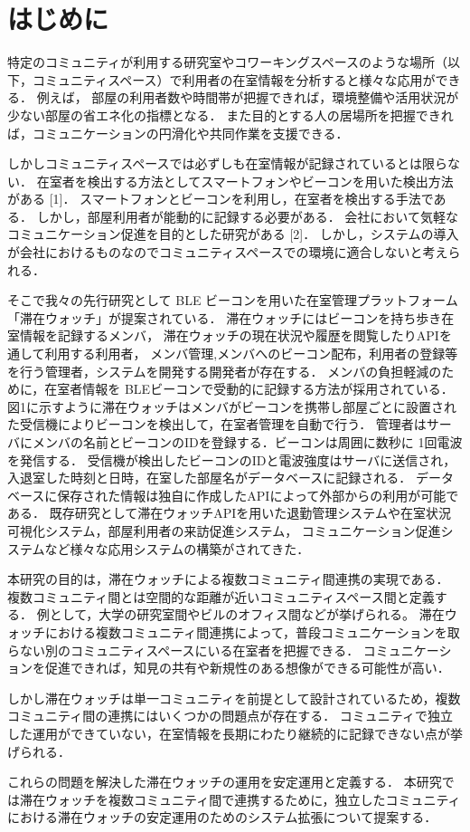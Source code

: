\pagestyle{empty}


\section{はじめに}
\label{sec:intro}
特定のコミュニティが利用する研究室やコワーキングスペースのような場所（以下，コミュニティスペース）で利用者の在室情報を分析すると様々な応用ができる．
例えば， 部屋の利用者数や時間帯が把握できれば，環境整備や活用状況が少ない部屋の省エネ化の指標となる．
また目的とする人の居場所を把握できれば，コミュニケーションの円滑化や共同作業を支援できる．

しかしコミュニティスペースでは必ずしも在室情報が記録されているとは限らない．
在室者を検出する方法としてスマートフォンやビーコンを用いた検出方法がある [1]．
スマートフォンとビーコンを利用し，在室者を検出する手法である．
しかし，部屋利用者が能動的に記録する必要がある．
会社において気軽なコミュニケーション促進を目的とした研究がある [2]．
しかし，システムの導入が会社におけるものなのでコミュニティスペースでの環境に適合しないと考えられる．

そこで我々の先行研究として BLE ビーコンを用いた在室管理プラットフォーム「滞在ウォッチ」が提案されている．
滞在ウォッチにはビーコンを持ち歩き在室情報を記録するメンバ，
滞在ウォッチの現在状況や履歴を閲覧したりAPIを通して利用する利用者，
メンバ管理,メンバへのビーコン配布，利用者の登録等を行う管理者，システムを開発する開発者が存在する．
メンバの負担軽減のために，在室者情報を BLEビーコンで受動的に記録する方法が採用されている．
図1に示すように滞在ウォッチはメンバがビーコンを携帯し部屋ごとに設置された受信機によりビーコンを検出して，在室者管理を自動で行う．
管理者はサーバにメンバの名前とビーコンのIDを登録する．ビーコンは周囲に数秒に 1回電波を発信する．
受信機が検出したビーコンのIDと電波強度はサーバに送信され，入退室した時刻と日時，在室した部屋名がデータベースに記録される．
データベースに保存された情報は独自に作成したAPIによって外部からの利用が可能である．
既存研究として滞在ウォッチAPIを用いた退勤管理システムや在室状況可視化システム，部屋利用者の来訪促進システム，
コミュニケーション促進システムなど様々な応用システムの構築がされてきた．

本研究の目的は，滞在ウォッチによる複数コミュニティ間連携の実現である．
複数コミュニティ間とは空間的な距離が近いコミュニティスペース間と定義する．
例として，大学の研究室間やビルのオフィス間などが挙げられる。
滞在ウォッチにおける複数コミュニティ間連携によって，普段コミュニケーションを取らない別のコミュニティスペースにいる在室者を把握できる．
コミュニケーションを促進できれば，知見の共有や新規性のある想像ができる可能性が高い．

しかし滞在ウォッチは単一コミュニティを前提として設計されているため，複数コミュニティ間の連携にはいくつかの問題点が存在する．
コミュニティで独立した運用ができていない，在室情報を長期にわたり継続的に記録できない点が挙げられる．


これらの問題を解決した滞在ウォッチの運用を安定運用と定義する．
本研究では滞在ウォッチを複数コミュニティ間で連携するために，独立したコミュニティにおける滞在ウォッチの安定運用のためのシステム拡張について提案する．